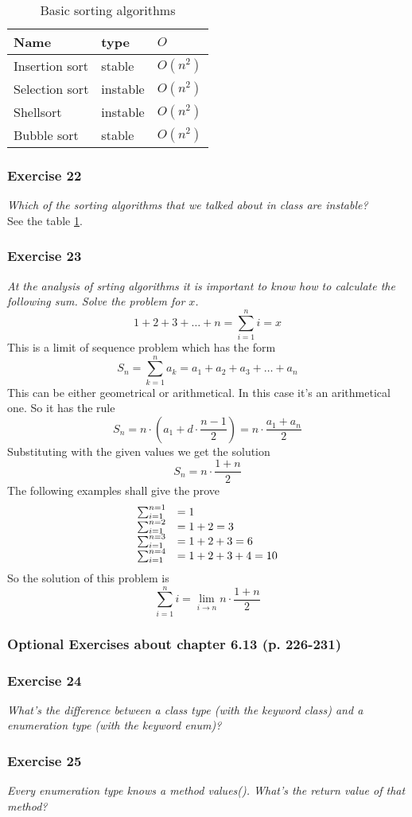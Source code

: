 \begin{table}[h!]
	\centering
	\begin{tabular}{l l l}
		Name		& type		& $O$ \\
		\hline
		Insertion sort	& stable	& $O(n^2)$ \\
		Selection sort	& instable	& $O(n^2)$ \\
		Shellsort	& instable	& $O(n^2)$ \\
		Bubble sort	& stable	& $O(n^2)$ 
	\end{tabular}
	\caption{Basic sorting algorithms}
	\label{table:sorting-algorithms}
\end{table}

\subsubsection*{Exercise 22}
\textit{Which of the sorting algorithms that we talked about in class 
are instable?} \\
See the table \ref{table:sorting-algorithms}.

\subsubsection*{Exercise 23}
\textit{At the analysis of srting algorithms it is important to know how to
calculate the following sum. Solve the problem for $x$.} \\
\[ 1 + 2 + 3 + \dots + n =  \sum_{i=1}^{n} i = x \]
This is a limit of sequence problem which has the form
\[ S_n = \sum_{k=1}^n a_k = a_1 + a_2 + a_3 + \dots + a_n \]
This can be either geometrical or arithmetical. In this case it's an 
arithmetical one. So it has the rule 
\[ S_n = n \cdot \left( a_1 + d \cdot \frac{n-1}{2}\right) = n \cdot \frac{a_1+a_n}{2} \]
Substituting with the given values we get the solution 
\[ S_n = n \cdot \frac{1+n}{2} \]
The following examples shall give the prove
\[ \begin{array}{l l l}
	\sum_{i=1}^{n=1} &= 1 \\
	\sum_{i=1}^{n=2} &= 1 + 2 = 3 \\
	\sum_{i=1}^{n=3} &= 1 + 2 + 3 = 6 \\
	\sum_{i=1}^{n=4} &= 1 + 2 + 3 + 4 = 10 \\
\end{array} \]
So the solution of this problem is 
\[ \sum_{i=1}^{n} i = \lim_{i \rightarrow n} n \cdot \frac{1+n}{2} \]

\subsubsection{Optional Exercises about chapter 6.13 (p. 226-231)}

\subsubsection*{Exercise 24}
\textit{What's the difference between a class type (with the keyword class)
and a enumeration type (with the keyword enum)?} \\

\subsubsection*{Exercise 25}
\textit{Every enumeration type knows a method values(). What's the return
value of that method?} \\

